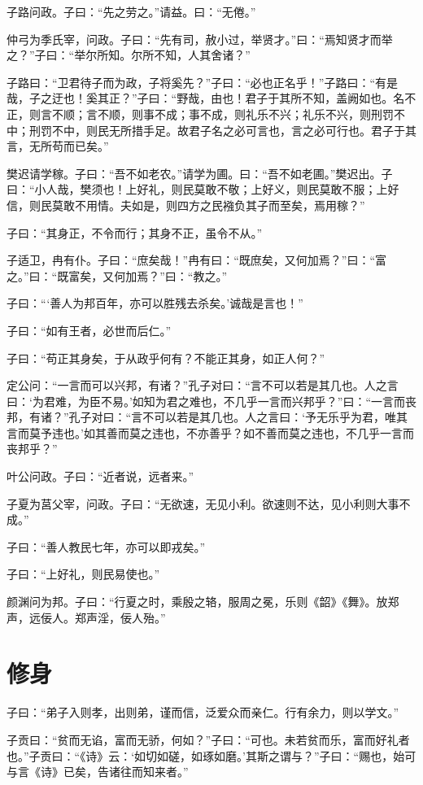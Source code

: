 \documentclass[a5paper]{ctexbook}
\begin{document}
    子路问政。子曰：“先之劳之。”请益。曰：“无倦。”

    仲弓为季氏宰，问政。子曰：“先有司，赦小过，举贤才。”曰：“焉知贤才而举之？”子曰：“举尔所知。尔所不知，人其舍诸？”

    子路曰：“卫君待子而为政，子将奚先？”子曰：“必也正名乎！”子路曰：“有是哉，子之迂也！奚其正？”子曰：“野哉，由也！君子于其所不知，盖阙如也。名不正，则言不顺；言不顺，则事不成；事不成，则礼乐不兴；礼乐不兴，则刑罚不中；刑罚不中，则民无所措手足。故君子名之必可言也，言之必可行也。君子于其言，无所苟而已矣。”

    樊迟请学稼。子曰：“吾不如老农。”请学为圃。曰：“吾不如老圃。”樊迟出。子曰：“小人哉，樊须也！上好礼，则民莫敢不敬；上好义，则民莫敢不服；上好信，则民莫敢不用情。夫如是，则四方之民襁负其子而至矣，焉用稼？”

    子曰：“其身正，不令而行；其身不正，虽令不从。”

    子适卫，冉有仆。子曰：“庶矣哉！”冉有曰：“既庶矣，又何加焉？”曰：“富之。”曰：“既富矣，又何加焉？”曰：“教之。”

    子曰：“‘善人为邦百年，亦可以胜残去杀矣。’诚哉是言也！”

    子曰：“如有王者，必世而后仁。”

    子曰：“苟正其身矣，于从政乎何有？不能正其身，如正人何？”

    定公问：“一言而可以兴邦，有诸？”孔子对曰：“言不可以若是其几也。人之言曰：‘为君难，为臣不易。’如知为君之难也，不几乎一言而兴邦乎？”曰：“一言而丧邦，有诸？”孔子对曰：“言不可以若是其几也。人之言曰：‘予无乐乎为君，唯其言而莫予违也。’如其善而莫之违也，不亦善乎？如不善而莫之违也，不几乎一言而丧邦乎？”

    叶公问政。子曰：“近者说，远者来。”

    子夏为莒父宰，问政。子曰：“无欲速，无见小利。欲速则不达，见小利则大事不成。”

    子曰：“善人教民七年，亦可以即戎矣。”

    子曰：“上好礼，则民易使也。”

    颜渊问为邦。子曰：“行夏之时，乘殷之辂，服周之冕，乐则《韶》《舞》。放郑声，远佞人。郑声淫，佞人殆。”

    \chapter{修身}

    子曰：“弟子入则孝，出则弟，谨而信，泛爱众而亲仁。行有余力，则以学文。”

    子贡曰：“贫而无谄，富而无骄，何如？”子曰：“可也。未若贫而乐，富而好礼者也。”子贡曰：“《诗》云：‘如切如磋，如琢如磨。’其斯之谓与？”子曰：“赐也，始可与言《诗》已矣，告诸往而知来者。”
\end{document}
